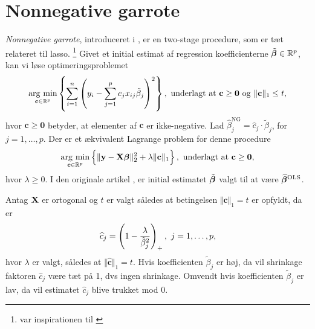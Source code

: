 \section{Nonnegative garrote}
\textit{Nonnegative garrote}, introduceret i \citep{nonnegative_garrote}, er en two-stage procedure, som er tæt relateret til lasso. \footnote{\citep{nonnegative_garrote} var inspirationen til \citep{lasso}} 
Givet et initial estimat af regression koefficienterne \(\tilde{\boldsymbol{\beta}} \in \mathbb{R}^p\), kan vi løse optimeringsproblemet
\begin{align}
\argmin_{\mathbf{c} \in \mathbb{R}^p}  \cbr{ \sum_{i=1}^n \del{y_i - \sum_{j=1}^p c_j x_{ij} \tilde{\beta}_j}^2}, \ \text{underlagt at } \mathbf{c} \geq \mathbf{0} \text{ og } \Vert \mathbf{c} \Vert_1 \leq t, \label{eq:2.19}
\end{align}
hvor \(\mathbf{c} \geq \mathbf{0}\) betyder, at elementer af \(\mathbf{c}\) er ikke-negative.
Lad \(\widehat{\beta}_j^\text{NG} = \widehat{c}_j \cdot \tilde{\beta}_j\), for \(j = 1, \ldots, p\).
Der er et ækvivalent Lagrange problem for denne procedure
\begin{align}
\argmin_{\mathbf{c} \in \mathbb{R}^p}  \cbr{\Vert \y - \X \tbeta \Vert_2^2 + \lambda \Vert \mathbf{c} \Vert_1}, \ \text{underlagt at } \mathbf{c} \geq \mathbf{0}, \label{eq:nonnegative_garrote}
\end{align}
hvor \(\lambda \geq 0\).
I den originale artikel \citep{nonnegative_garrote}, er initial estimatet \(\tilde{\boldsymbol{\beta}}\) valgt til at være \(\widehat{\boldsymbol{\beta}}^\text{OLS}\).
 
Antag \(\mathbf{X}\) er ortogonal og \(t\) er valgt således at betingelsen \(\Vert \mathbf{c} \Vert_1 = t\) er opfyldt, da er
\begin{align*}
\widehat{c}_j = \del{1 - \frac{\lambda}{\tilde{\beta}_j^2}}_+, \ j = 1, \ldots, p,
\end{align*}
hvor \(\lambda\) er valgt, således at \(\Vert \widehat{\mathbf{c}} \Vert_1 = t\).
Hvis koefficienten \(\tilde{\beta}_j\) er høj, da vil shrinkage faktoren \(\widehat{c}_j\) være tæt på 1, dvs ingen shrinkage.
Omvendt hvis koefficienten \(\tilde{\beta}_j\) er lav, da vil estimatet \(\widehat{c}_j\) blive trukket mod 0.

